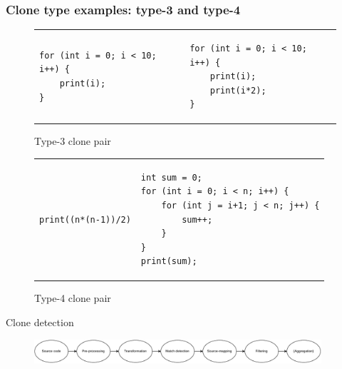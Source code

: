 \documentclass[aspectratio=1610]{beamer}
\begin{document}
\begin{frame}[fragile]
	\frametitle{Clone type examples: type-3 and type-4}
    \vspace{0.5cm}
	\begin{figure}[t]
		\begin{center}
			\begin{tabular}{p{6cm} | p{6cm}}
				\begin{lstlisting}
for (int i = 0; i < 10; i++) {
    print(i);
}\end{lstlisting} &
				\begin{lstlisting}
for (int i = 0; i < 10; i++) {
    print(i);
    print(i*2);
}\end{lstlisting}
			\end{tabular}
		\end{center}
		\caption{Type-3 clone pair}
		\label{fig:type3clone}
	\end{figure}
    \vspace{-0.5cm}

	\begin{figure}[t]
		\begin{center}
			\begin{tabular}{r | p{6.5cm}}
				\hspace{3.2cm}\begin{lstlisting}
print((n*(n-1))/2)
\end{lstlisting} &
				\begin{lstlisting}
int sum = 0;
for (int i = 0; i < n; i++) {
    for (int j = i+1; j < n; j++) {
        sum++;
    }
}
print(sum);
            \end{lstlisting}
			\end{tabular}
		\end{center}
		\caption{Type-4 clone pair}
		\label{fig:type4clone}
	\end{figure}
\end{frame}

\begin{frame}{Clone detection}
    \begin{figure}
        \begin{center}
            \includegraphics[width=0.95\textwidth]{figures/detectionphases.drawio.pdf}
        \end{center}
    \end{figure}
\end{frame}
\end{document}
